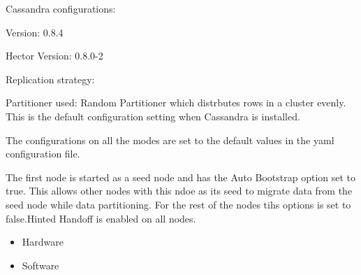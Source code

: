 % 
% 
% 
% 
% 



Cassandra configurations:

Version: 0.8.4

Hector Version: 0.8.0-2

Replication strategy:

Partitioner used: Random Partitioner which distrbutes rows in a cluster evenly.
This is the default configuration setting when Cassandra is installed.

The configurations on all the modes are set to the default values in the yaml
configuration file.

The first node is started as a seed node and has the Auto Bootstrap option set
to true. This allows other nodes with this ndoe as its seed to migrate data from
the seed node while data partitioning. For the rest of the nodes tihs options is
set to false.Hinted Handoff is enabled on all nodes.

\begin{itemize}
  \item Hardware
  \item Software
\end{itemize}










